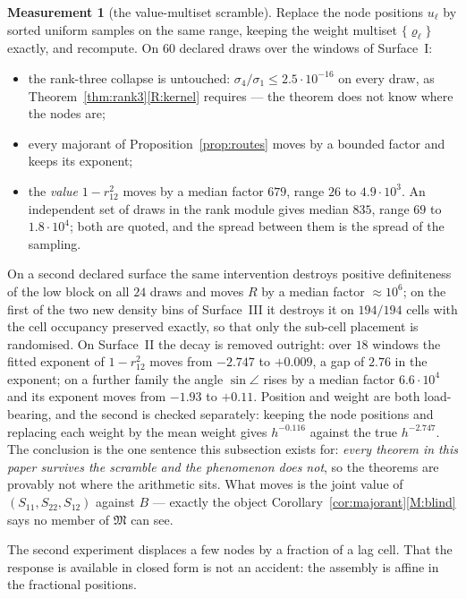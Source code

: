 \documentclass[11pt,a4paper]{article}
\theoremstyle{plain}
\theoremstyle{definition}
\newtheorem{measurement}[theorem]{Measurement}
\begin{document}
\begin{measurement}[the value-multiset scramble]
\label{meas:placement}
Replace the node positions $u_\ell$ by sorted uniform samples on the same range,
keeping the weight multiset $\{\varrho_\ell\}$ exactly, and recompute. On $60$
declared draws over the windows of Surface~I:
\begin{itemize}
\item the rank-three collapse is untouched:
  $\sigma_4/\sigma_1\le2.5\cdot10^{-16}$ on every draw, as
  Theorem~\ref{thm:rank3}\ref{R:kernel} requires --- the theorem does not know
  where the nodes are;
\item every majorant of Proposition~\ref{prop:routes} moves by a bounded factor
  and keeps its exponent;
\item the \emph{value} $1-r_{12}^{2}$ moves by a median factor $679$, range
  $26$ to $4.9\cdot10^{3}$. An independent set of draws in the rank module
  gives median $835$, range $69$ to $1.8\cdot10^{4}$; both are quoted, and the
  spread between them is the spread of the sampling.
\end{itemize}
On a second declared surface the same intervention destroys positive
definiteness of the low block on all $24$ draws and moves $R$ by a median
factor $\approx10^{6}$; on the first of the two new density bins of
Surface~III it destroys it on $194/194$ cells with the cell occupancy preserved
exactly, so that only the sub-cell placement is randomised. On Surface~II the
decay is removed outright: over $18$ windows the fitted exponent of
$1-r_{12}^{2}$ moves from $-2.747$ to $+0.009$, a gap of $2.76$ in the
exponent; on a further family the angle $\sin\angle$ rises by a median factor
$6.6\cdot10^{4}$ and its exponent moves from $-1.93$ to $+0.11$. Position and
weight are both load-bearing, and the second is checked separately: keeping the
node positions and replacing each weight by the mean weight gives $h^{-0.116}$
against the true $h^{-2.747}$. The conclusion is
the one sentence this subsection exists for: \emph{every theorem in this paper
survives the scramble and the phenomenon does not}, so the theorems are provably
not where the arithmetic sits. What moves is the joint value of
$(S_{11},S_{22},S_{12})$ against $B$ --- exactly the object
Corollary~\ref{cor:majorant}\ref{M:blind} says no member of $\mathfrak M$ can
see.
\end{measurement}

The second experiment displaces a few nodes by a fraction of a lag cell. That
the response is available in closed form is not an accident: the assembly is
affine in the fractional positions.
\end{document}
